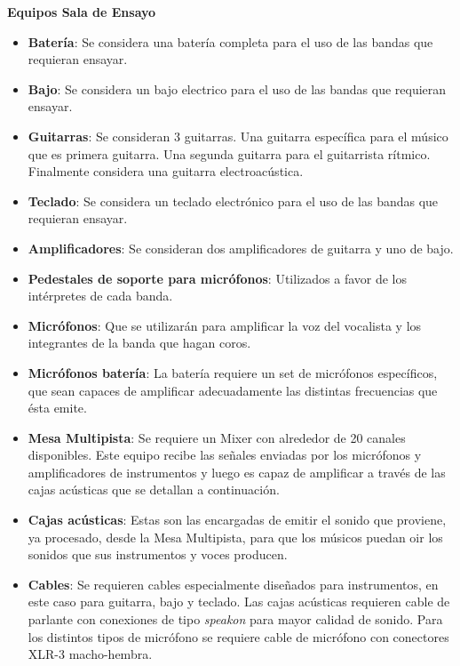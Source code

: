 \textbf{Equipos Sala de Ensayo}
\begin{itemize}
	\item \textbf{Batería}: Se considera una batería completa para el uso
         de las bandas que requieran ensayar.
	\item \textbf{Bajo}: Se considera un bajo electrico para el uso
         de las bandas que requieran ensayar.
	\item \textbf{Guitarras}: Se consideran 3 guitarras. Una guitarra
	      específica para el músico que es primera guitarra. Una
	      segunda guitarra para el guitarrista rítmico. Finalmente
	      considera una guitarra electroacústica.
	\item \textbf{Teclado}: Se considera un teclado electrónico para
         el uso de las bandas que requieran  ensayar.
	\item \textbf{Amplificadores}: Se consideran dos amplificadores de guitarra
	      y uno de bajo.
	\item \textbf{Pedestales de soporte para micrófonos}: Utilizados a favor
         de los intérpretes de cada banda.
	\item \textbf{Micrófonos}: Que se utilizarán para amplificar
	      la voz del vocalista y los integrantes de la banda
	      que hagan coros.
	\item \textbf{Micrófonos batería}: La batería requiere un 
	      set de micrófonos específicos, que sean capaces
	      de amplificar adecuadamente las distintas 
	      frecuencias que ésta emite.
	\item \textbf{Mesa Multipista}: Se requiere un Mixer con 
	      alrededor de 20 canales disponibles. Este equipo
	      recibe las señales enviadas por los micrófonos y amplificadores
	      de instrumentos y luego es capaz de amplificar
	      a través de las cajas acústicas que se detallan a 
	      continuación.
	\item \textbf{Cajas acústicas}: Estas son las encargadas de emitir
	      el sonido que proviene, ya procesado, desde la Mesa
	      Multipista, para que los músicos puedan oir los sonidos que
	      sus instrumentos y voces producen.
	\item \textbf{Cables}: Se requieren cables especialmente diseñados
	      para instrumentos, en este caso para guitarra, bajo
	      y teclado. Las cajas acústicas requieren cable
	      de parlante con conexiones de tipo \textit{speakon}
	      para mayor calidad de sonido. Para los distintos
	      tipos de micrófono se requiere cable de micrófono
	      con conectores XLR-3 macho-hembra.

\end{itemize}
